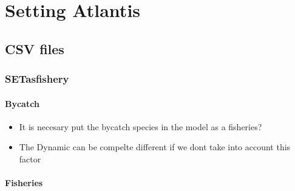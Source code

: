 \documentclass[11pt]{article}
\begin{document}
\section*{Setting Atlantis}
\label{sec-5}
\subsection*{CSV files}
\label{sec-5-1}
\subsubsection*{SETasfishery}
\label{sec-5-1-1}
\paragraph*{Bycatch}
\label{sec-5-1-1-1}

\begin{itemize}
\item It is necesary put the bycatch species in the model as a fisheries?
\item The Dynamic can be compelte different if we dont take into account this factor
\end{itemize}
\paragraph*{Fisheries}
\label{sec-5-1-1-2}
\end{document}
